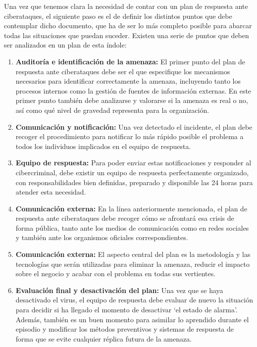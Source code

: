 Una vez que tenemos clara la necesidad de contar con un plan de respuesta ante ciberataques, el 
siguiente paso es el de definir los distintos puntos que debe contemplar dicho documento, que ha de 
ser lo más completo posible para abarcar todas las situaciones que puedan suceder. Existen una serie 
de puntos que deben ser analizados en un plan de esta índole:

\begin{enumerate}

\item {\bfseries Auditoría e identificación de la amenaza:}
El primer punto del plan de respuesta ante ciberataques debe ser el que especifique los mecanismos 
necesarios para identificar correctamente la amenaza, incluyendo tanto los procesos internos como
la gestión de fuentes de información externas. En este primer punto también debe analizarse y 
valorarse si la amenaza es real o no, así como qué nivel de gravedad representa para la organización.

\item {\bfseries Comunicación y notificación:}
Una vez detectado el incidente, el plan debe recoger el procedimiento para notificar lo más rápido 
posible el problema a todos los individuos implicados en el equipo de respuesta.

\item {\bfseries Equipo de respuesta:}
Para poder enviar estas notificaciones y responder al cibercriminal, debe existir un equipo de respuesta 
perfectamente organizado, con responsabilidades bien definidas, preparado y disponible las 24 horas 
para atender esta necesidad.

\item {\bfseries Comunicación externa:}
En la línea anteriormente mencionada, el plan de respuesta ante ciberataques debe recoger cómo se 
afrontará esa crisis de forma pública, tanto ante los medios de comunicación como en redes sociales 
y también ante los organismos oficiales correspondientes.

\item {\bfseries Comunicación externa:}
El aspecto central del plan es la metodología y las tecnologías que serán utilizadas para eliminar la 
amenaza, reducir el impacto sobre el negocio y acabar con el problema en todas sus vertientes.

\item {\bfseries Evaluación final y desactivación del plan:}
Una vez que se haya desactivado el virus, el equipo de respuesta debe evaluar de nuevo la situación 
para decidir si ha llegado el momento de desactivar ‘el estado de alarma’. Además, también es un buen 
momento para asimilar lo aprendido durante el episodio y modificar los métodos preventivos y sistemas 
de respuesta de forma que se evite cualquier réplica futura de la amenaza.

\end{enumerate}




